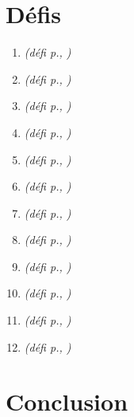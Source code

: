 \documentclass[11pt]{article}
\newcommand{\defi}[1]{\emph{(défi p.\pageref{#1}, \cite{#1})}}
\begin{document}


\section*{Défis}
\begin{enumerate}
\item \defi{combinatoire}
\item \defi{vert}
\item \defi{GLE}
\item \defi{debuggers}
\item \defi{securite}
\item \defi{coevolution}
\item \defi{compilation}
\item \defi{reconfiguration}
\item \defi{argumentation}
\item \defi{IA}
\item \defi{Monniaux}
\item \defi{formelle}
\end{enumerate}
\section{Conclusion}


\label{vert}


\label{combinatoire}


\label{formelle}








\label{argumentation}


\label{Monniaux}


\label{coevolution}


\label{compilation}


\label{IA}


\label{debuggers}



\label{reconfiguration}


\label{GLE}


\label{securite}

\end{document}
